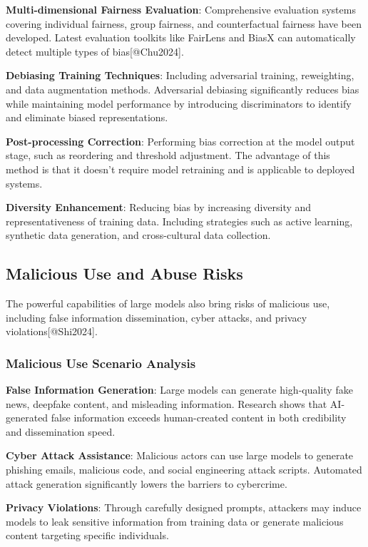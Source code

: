 \documentclass{article}
\begin{document}
\textbf{Multi-dimensional Fairness Evaluation}: Comprehensive evaluation systems covering individual fairness, group fairness, and counterfactual fairness have been developed. Latest evaluation toolkits like FairLens and BiasX can automatically detect multiple types of bias[@Chu2024].

\textbf{Debiasing Training Techniques}: Including adversarial training, reweighting, and data augmentation methods. Adversarial debiasing significantly reduces bias while maintaining model performance by introducing discriminators to identify and eliminate biased representations.

\textbf{Post-processing Correction}: Performing bias correction at the model output stage, such as reordering and threshold adjustment. The advantage of this method is that it doesn't require model retraining and is applicable to deployed systems.

\textbf{Diversity Enhancement}: Reducing bias by increasing diversity and representativeness of training data. Including strategies such as active learning, synthetic data generation, and cross-cultural data collection.

\subsection{Malicious Use and Abuse Risks}
The powerful capabilities of large models also bring risks of malicious use, including false information dissemination, cyber attacks, and privacy violations[@Shi2024].

\subsubsection{Malicious Use Scenario Analysis}
\textbf{False Information Generation}: Large models can generate high-quality fake news, deepfake content, and misleading information. Research shows that AI-generated false information exceeds human-created content in both credibility and dissemination speed.

\textbf{Cyber Attack Assistance}: Malicious actors can use large models to generate phishing emails, malicious code, and social engineering attack scripts. Automated attack generation significantly lowers the barriers to cybercrime.

\textbf{Privacy Violations}: Through carefully designed prompts, attackers may induce models to leak sensitive information from training data or generate malicious content targeting specific individuals.
\end{document}
